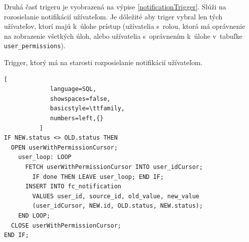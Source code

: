 \documentclass[slovak]{fitthesis}
\begin{document}
 Druhá časť trigeru je vyobrazená na výpise \ref{notificationTrigger}. Slúži na rozosielanie notifikácií užívateľom. Je dôležité aby triger vybral len tých užívateľov, ktorí majú k~úlohe prístup (užívatelia s~rolou, ktorá má oprávnenie na zobrazenie všetkých úloh, alebo užívatelia s~oprávnením k~úlohe v~tabuľke \texttt{user\_permissions}).
\begin{algorithm}[H]
  \caption{Trigger, ktorý má na starosti rozposielanie notifikácií užívateľom.}
  \label{notificationTrigger}
  \begin{lstlisting}[
             language=SQL,
             showspaces=false,
             basicstyle=\ttfamily,
             numbers=left,{}
          ]
IF NEW.status <> OLD.status THEN 
  OPEN userWithPermissionCursor; 
    user_loop: LOOP
      FETCH userWithPermissionCursor INTO user_idCursor;
        IF done THEN LEAVE user_loop; END IF;
      INSERT INTO fc_notification 
        VALUES user_id, source_id, old_value, new_value
        (user_idCursor, NEW.id, OLD.status, NEW.status);
    END LOOP;
  CLOSE userWithPermissionCursor;
END IF;
  \end{lstlisting}
\end{algorithm}
\end{document}
